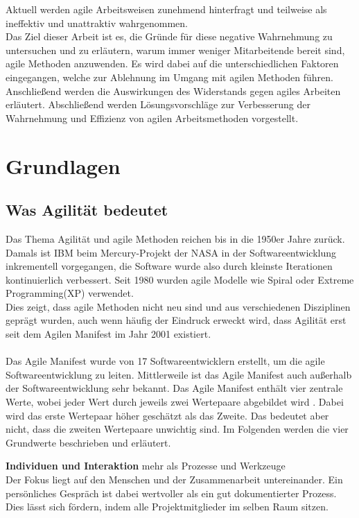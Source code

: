 \documentclass[ngerman]{seminarvorlage}
\begin{document}
Aktuell werden agile Arbeitsweisen zunehmend hinterfragt und teilweise als ineffektiv und unattraktiv wahrgenommen.\\
Das Ziel dieser Arbeit ist es, die Gründe für diese negative Wahrnehmung zu untersuchen und zu erläutern, warum immer weniger Mitarbeitende bereit sind, agile Methoden anzuwenden. Es wird dabei auf die unterschiedlichen Faktoren eingegangen, welche zur Ablehnung im Umgang mit agilen Methoden führen. Anschließend werden die Auswirkungen des Widerstands gegen agiles Arbeiten erläutert. Abschließend werden Lösungsvorschläge zur Verbesserung der Wahrnehmung und Effizienz von agilen Arbeitsmethoden vorgestellt.



\section{Grundlagen}
\subsection{Was Agilität bedeutet}
Das Thema Agilität und agile Methoden reichen bis in die 1950er Jahre zurück. Damals ist IBM beim Mercury-Projekt der NASA in der Softwareentwicklung inkrementell vorgegangen, die Software wurde also durch kleinste Iterationen kontinuierlich verbessert. Seit 1980 wurden agile Modelle wie Spiral oder Extreme Programming(XP) verwendet.\\
Dies zeigt, dass agile Methoden nicht neu sind und aus verschiedenen Disziplinen geprägt wurden, auch wenn häufig der Eindruck erweckt wird, dass Agilität erst seit dem Agilen Manifest im Jahr 2001 existiert.\cite{Simschek.2022}\\\\
Das Agile Manifest wurde von 17 Softwareentwicklern erstellt, um die agile Softwareentwicklung zu leiten. Mittlerweile ist das Agile Manifest auch außerhalb der Softwareentwicklung sehr bekannt.
Das Agile Manifest enthält vier zentrale Werte, wobei jeder Wert durch jeweils zwei Wertepaare abgebildet wird . Dabei wird das erste Wertepaar höher geschätzt als das Zweite. Das bedeutet aber nicht, dass die zweiten Wertepaare unwichtig sind. Im Folgenden werden die vier Grundwerte beschrieben und erläutert.

\textbf{Individuen und Interaktion} mehr als Prozesse und Werkzeuge\\
Der Fokus liegt auf den Menschen und der Zusammenarbeit untereinander. Ein persönliches Gespräch ist dabei wertvoller als ein gut dokumentierter Prozess. Dies lässt sich fördern, indem alle Projektmitglieder im selben Raum sitzen.
\end{document}
